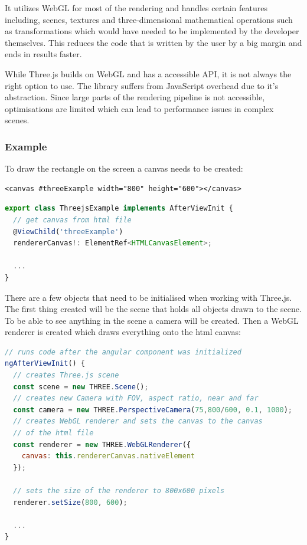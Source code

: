 It utilizes WebGL for most of the rendering and handles certain features including, scenes, textures and three-dimensional mathematical operations such as transformations which would have needed to be implemented by the developer themselves. This reduces the code that is written by the user by a big margin and ends in results faster.\ \cite{Web:32}

While Three.js builds on WebGL and has a accessible API, it is not always the right option to use. The library suffers from JavaScript overhead due to it's abstraction. Since large parts of the rendering pipeline is not accessible, optimisations are limited which can lead to performance issues in complex scenes.\ \cite{Web:34}

\subsubsection{Example}
To draw the rectangle on the screen a canvas needs to be created:

\begin{lstlisting}[language={[AS]HTML}, caption=Three.js canvas 1]
<canvas #threeExample width="800" height="600"></canvas>
\end{lstlisting}

\begin{lstlisting}[language=JavaScript,caption=Three.js code 1]
export class ThreejsExample implements AfterViewInit {
  // get canvas from html file
  @ViewChild('threeExample')
  rendererCanvas!: ElementRef<HTMLCanvasElement>;
  
  ...
}
\end{lstlisting}

There are a few objects that need to be initialised when working with Three.js. The first thing created will be the scene that holds all objects drawn to the scene. To be able to see anything in the scene a camera will be created. Then a WebGL renderer is created which draws everything onto the html canvas: \\

\begin{lstlisting}[language=JavaScript,caption=Three.js code 2]
// runs code after the angular component was initialized
ngAfterViewInit() {
  // creates Three.js scene
  const scene = new THREE.Scene(); 
  // creates new Camera with FOV, aspect ratio, near and far
  const camera = new THREE.PerspectiveCamera(75,800/600, 0.1, 1000);
  // creates WebGL renderer and sets the canvas to the canvas 
  // of the html file
  const renderer = new THREE.WebGLRenderer({
    canvas: this.rendererCanvas.nativeElement
  });

  // sets the size of the renderer to 800x600 pixels
  renderer.setSize(800, 600);

  ...
}
\end{lstlisting}

